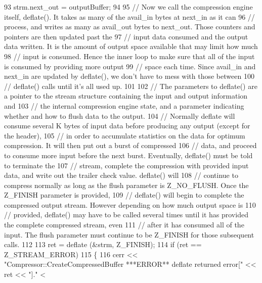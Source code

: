 \begin{DoxyCode}
93       strm.next\_out  = outputBuffer;
94       
95       \textcolor{comment}{// Now we call the compression engine itself, deflate(). It takes as many of the avail\_in bytes at
       next\_in as it can}
96       \textcolor{comment}{// process, and writes as many as avail\_out bytes to next\_out. Those counters and pointers are then
       updated past the}
97       \textcolor{comment}{// input data consumed and the output data written. It is the amount of output space available that
       may limit how much}
98       \textcolor{comment}{// input is consumed. Hence the inner loop to make sure that all of the input is consumed by
       providing more output}
99       \textcolor{comment}{// space each time. Since avail\_in and next\_in are updated by deflate(), we don't have to mess with
       those between}
100       \textcolor{comment}{// deflate() calls until it's all used up.}
101 
102       \textcolor{comment}{// The parameters to deflate() are a pointer to the stream structure containing the input and output
       information and}
103       \textcolor{comment}{// the internal compression engine state, and a parameter indicating whether and how to flush data to
       the output.}
104       \textcolor{comment}{// Normally deflate will consume several K bytes of input data before producing any output (except
       for the header),}
105       \textcolor{comment}{// in order to accumulate statistics on the data for optimum compression. It will then put out a
       burst of compressed}
106       \textcolor{comment}{// data, and proceed to consume more input before the next burst. Eventually, deflate() must be told
       to terminate the}
107       \textcolor{comment}{// stream, complete the compression with provided input data, and write out the trailer check value.
       deflate() will}
108       \textcolor{comment}{// continue to compress normally as long as the flush parameter is Z\_NO\_FLUSH. Once the Z\_FINISH
       parameter is provided,}
109       \textcolor{comment}{// deflate() will begin to complete the compressed output stream. However depending on how much
       output space is}
110       \textcolor{comment}{// provided, deflate() may have to be called several times until it has provided the complete
       compressed stream, even}
111       \textcolor{comment}{// after it has consumed all of the input. The flush parameter must continue to be Z\_FINISH for those
       subsequent calls.}
112 
113       ret = deflate (&strm, Z\_FINISH);
114       \textcolor{keywordflow}{if}  (ret == Z\_STREAM\_ERROR)
115       \{
116         cerr << \textcolor{stringliteral}{"Compressor::CreateCompressedBuffer  ***ERROR**   deflate returned error["} << ret << \textcolor{stringliteral}{"]."} <

\end{DoxyCode}
